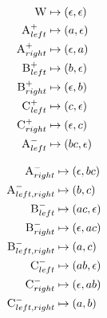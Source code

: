 \documentclass[nonatbib,numbers,10pt]{sigplanconf}
\newcommand\s{\textsc}
\begin{document}
\begin{minipage}{.2\textwidth}
\begin{align*}
\s{W} &\mapsto (\epsilon, \epsilon) \\
\s{A}^+_{left} &\mapsto (a, \epsilon) \\
\s{A}^+_{right} &\mapsto (\epsilon, a) \\
\s{B}^+_{left} &\mapsto (b, \epsilon) \\
\s{B}^+_{right} &\mapsto (\epsilon, b) \\
\s{C}^+_{left} &\mapsto (c, \epsilon) \\
\s{C}^+_{right} &\mapsto (\epsilon, c) \\
\s{A}^-_{left} &\mapsto (bc, \epsilon) 
\end{align*}
\end{minipage}
\begin{minipage}{.2\textwidth}
\begin{align*}
\s{A}^-_{right} &\mapsto (\epsilon, bc) \\
\s{A}^-_{left, right} &\mapsto (b, c) \\
\s{B}^-_{left} &\mapsto (ac, \epsilon) \\
\s{B}^-_{right} &\mapsto (\epsilon, ac) \\
\s{B}^-_{left, right} &\mapsto (a, c) \\
\s{C}^-_{left} &\mapsto (ab, \epsilon) \\
\s{C}^-_{right} &\mapsto (\epsilon, ab) \\
\s{C}^-_{left, right} &\mapsto (a, b)
\end{align*}
\end{minipage}
\end{document}
